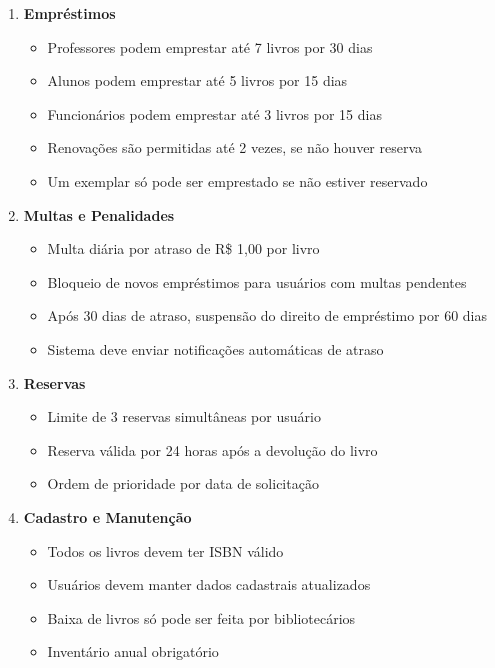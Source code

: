 \documentclass[12pt,a4paper]{article}
\begin{document}
\begin{enumerate}[label=\textbf{RN\arabic*.}, leftmargin=*]
    \item \textbf{Empréstimos}
    \begin{itemize}
        \item Professores podem emprestar até 7 livros por 30 dias
        \item Alunos podem emprestar até 5 livros por 15 dias
        \item Funcionários podem emprestar até 3 livros por 15 dias
        \item Renovações são permitidas até 2 vezes, se não houver reserva
        \item Um exemplar só pode ser emprestado se não estiver reservado
    \end{itemize}

    \item \textbf{Multas e Penalidades}
    \begin{itemize}
        \item Multa diária por atraso de R\$ 1,00 por livro
        \item Bloqueio de novos empréstimos para usuários com multas pendentes
        \item Após 30 dias de atraso, suspensão do direito de empréstimo por 60 dias
        \item Sistema deve enviar notificações automáticas de atraso
    \end{itemize}

    \item \textbf{Reservas}
    \begin{itemize}
        \item Limite de 3 reservas simultâneas por usuário
        \item Reserva válida por 24 horas após a devolução do livro
        \item Ordem de prioridade por data de solicitação
    \end{itemize}

    \item \textbf{Cadastro e Manutenção}
    \begin{itemize}
        \item Todos os livros devem ter ISBN válido
        \item Usuários devem manter dados cadastrais atualizados
        \item Baixa de livros só pode ser feita por bibliotecários
        \item Inventário anual obrigatório
    \end{itemize}
\end{enumerate}
\end{document}
